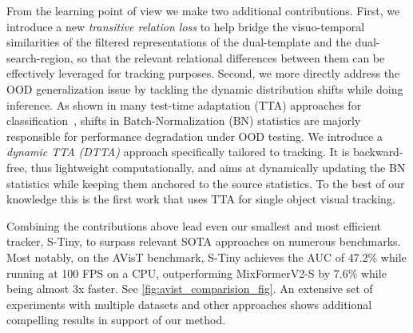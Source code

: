 From the learning point of view we make two additional contributions. First, we introduce a new \emph{transitive relation loss} to help bridge the visuo-temporal similarities of the filtered representations of the dual-template and the dual-search-region, so that the relevant relational differences between them can be effectively leveraged for tracking purposes. Second, we more directly address the OOD generalization issue by tackling the dynamic distribution shifts while doing inference. As shown in many test-time adaptation (TTA) approaches for classification~\cite{wang2020tent,mirza2022norm, pan2018two, niu2022efficient, schneider2020improving, li2016revisiting}, shifts in Batch-Normalization (BN) statistics are majorly responsible for performance degradation under OOD testing. We introduce a \emph{dynamic TTA (DTTA)} approach specifically tailored to tracking. It is backward-free, thus lightweight computationally, and aims at dynamically updating the BN statistics while keeping them anchored to the source statistics. To the best of our knowledge this is the first work that uses TTA for single object visual tracking.


Combining the contributions above lead even our smallest and most efficient tracker, S-Tiny, to surpass relevant SOTA approaches on numerous benchmarks. Most notably, on the AVisT benchmark, S-Tiny achieves the AUC of 47.2\% while running at 100 FPS on a CPU, outperforming MixFormerV2-S by 7.6\% while being almost 3x faster. 
See \ref{fig:avist_comparision_fig}. 
An extensive set of experiments with multiple datasets and other approaches shows additional compelling results in support of our method.